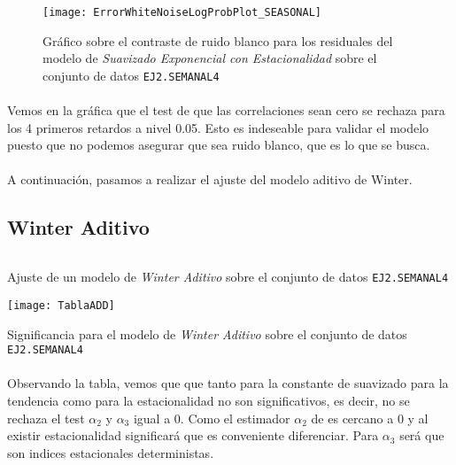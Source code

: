 \documentclass[a4paper, spanish]{article}
\begin{document}
      \begin{figure}[htb!]
        \centering
        \texttt{[image: ErrorWhiteNoiseLogProbPlot\_SEASONAL]}
        \caption{Gráfico sobre el contraste de ruido blanco para los residuales del modelo de \emph{Suavizado Exponencial con Estacionalidad} sobre el conjunto de datos \texttt{EJ2.SEMANAL4}}
        \label{img:b_seasonal_test_white_noise}
      \end{figure}

      \paragraph{}
      Vemos en la gráfica que el test de que las correlaciones sean cero se rechaza para los 4 primeros retardos a nivel 0.05. Esto es indeseable para validar el modelo puesto que no podemos asegurar que sea ruido blanco, que es lo que se busca.

      \paragraph{}
      A continuación, pasamos a realizar el ajuste del modelo aditivo de Winter.

    \subsection{Winter Aditivo}

      \begin{listing}[htb!]
        \centering
        \inputminted{SAS}{./res/code/b-01-esm-winteradd.sas}
        \caption{Ajuste de un modelo de \emph{Winter Aditivo} sobre el conjunto de datos \texttt{EJ2.SEMANAL4}}
        \label{code:b_winter_additive_esm}
      \end{listing}

      \begin{table}[htb!]
        \centering
        \texttt{[image: TablaADD]}
        \caption{Significancia para el modelo de \emph{Winter Aditivo} sobre el conjunto de datos \texttt{EJ2.SEMANAL4}}
        \label{table:b_winter_additive_significance}
      \end{table}

      \paragraph{}
      Observando la tabla, vemos que que tanto para la constante de suavizado para la tendencia como para la estacionalidad no son significativos, es decir, no se rechaza el test $\alpha_2$ y $\alpha_3$ igual a 0. Como el estimador $\alpha_2$ de es cercano a 0 y al existir estacionalidad significará que es conveniente diferenciar. Para $\alpha_3$ será que son indices estacionales deterministas.
\end{document}
